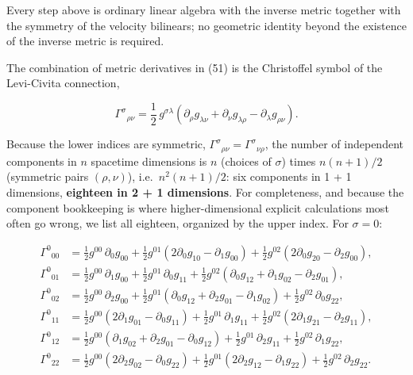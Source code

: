 \documentclass[
]{article}
\begin{document}
Every step above is ordinary linear algebra with the inverse metric
together with the symmetry of the velocity bilinears; no geometric
identity beyond the existence of the inverse metric is required.

The combination of metric derivatives in (51) is the Christoffel symbol
of the Levi-Civita connection,

\[\Gamma^{\sigma}{}_{\rho\nu} = \frac{1}{2}\, g^{\sigma\lambda} \left( \partial_{\rho} g_{\lambda\nu} + \partial_{\nu} g_{\lambda\rho} - \partial_{\lambda} g_{\rho\nu} \right). \tag{52}\]

Because the lower indices are symmetric,
\(\Gamma^{\sigma}{}_{\rho\nu} = \Gamma^{\sigma}{}_{\nu\rho}\), the
number of independent components in \(n\) spacetime dimensions is \(n\)
(choices of \(\sigma\)) times \(n(n+1)/2\) (symmetric pairs
\((\rho, \nu)\)), i.e.~\(n^{2}(n+1)/2\): six components in 1 + 1
dimensions, \textbf{eighteen in 2 + 1 dimensions}. For completeness, and
because the component bookkeeping is where higher-dimensional explicit
calculations most often go wrong, we list all eighteen, organized by the
upper index. For \(\sigma = 0\):

\[\begin{aligned}
\Gamma^{0}{}_{00} &= \tfrac{1}{2} g^{00}\, \partial_{0} g_{00} + \tfrac{1}{2} g^{01} \left( 2 \partial_{0} g_{10} - \partial_{1} g_{00} \right) + \tfrac{1}{2} g^{02} \left( 2 \partial_{0} g_{20} - \partial_{2} g_{00} \right), \\
\Gamma^{0}{}_{01} &= \tfrac{1}{2} g^{00}\, \partial_{1} g_{00} + \tfrac{1}{2} g^{01}\, \partial_{0} g_{11} + \tfrac{1}{2} g^{02} \left( \partial_{0} g_{12} + \partial_{1} g_{02} - \partial_{2} g_{01} \right), \\
\Gamma^{0}{}_{02} &= \tfrac{1}{2} g^{00}\, \partial_{2} g_{00} + \tfrac{1}{2} g^{01} \left( \partial_{0} g_{12} + \partial_{2} g_{01} - \partial_{1} g_{02} \right) + \tfrac{1}{2} g^{02}\, \partial_{0} g_{22}, \\
\Gamma^{0}{}_{11} &= \tfrac{1}{2} g^{00} \left( 2 \partial_{1} g_{01} - \partial_{0} g_{11} \right) + \tfrac{1}{2} g^{01}\, \partial_{1} g_{11} + \tfrac{1}{2} g^{02} \left( 2 \partial_{1} g_{21} - \partial_{2} g_{11} \right), \\
\Gamma^{0}{}_{12} &= \tfrac{1}{2} g^{00} \left( \partial_{1} g_{02} + \partial_{2} g_{01} - \partial_{0} g_{12} \right) + \tfrac{1}{2} g^{01}\, \partial_{2} g_{11} + \tfrac{1}{2} g^{02}\, \partial_{1} g_{22}, \\
\Gamma^{0}{}_{22} &= \tfrac{1}{2} g^{00} \left( 2 \partial_{2} g_{02} - \partial_{0} g_{22} \right) + \tfrac{1}{2} g^{01} \left( 2 \partial_{2} g_{12} - \partial_{1} g_{22} \right) + \tfrac{1}{2} g^{02}\, \partial_{2} g_{22}.
\end{aligned} \tag{53}\]
\end{document}
